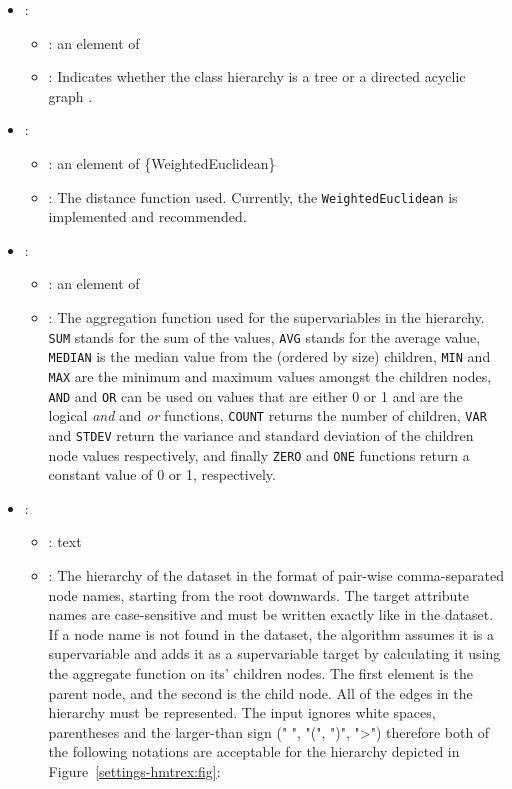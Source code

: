 \begin{itemize}
    \item {}:
           \begin{itemize}
                \item \optionPossibleValues{}: an element of 
                \item \optionDescrption{}: Indicates whether the class hierarchy is a tree or a directed acyclic graph \cite{Vens08:jrnl}.
           \end{itemize}
    \item {}:
           \begin{itemize}
                \item \optionPossibleValues{}: an element of \{WeightedEuclidean\}
                \item \optionDescrption{}: The distance function used. Currently, the {\tt WeightedEuclidean} is implemented and recommended.
           \end{itemize}
    \item {}:
           \begin{itemize}
                \item \optionPossibleValues{}: an element of 
                \item \optionDescrption{}:  The aggregation function used for the supervariables in the hierarchy.  {\tt SUM} stands for the sum of the values, {\tt AVG} stands for the average value, {\tt MEDIAN} is the median value from the (ordered by size) children, {\tt MIN} and {\tt MAX} are the minimum and maximum values amongst the children nodes, {\tt AND} and {\tt OR} can be used on values that are either 0 or 1 and are the logical \textit{and} and \textit{or} functions, {\tt COUNT} returns the number of children, {\tt VAR} and {\tt STDEV} return the variance and standard deviation of the children node values respectively, and finally {\tt ZERO} and {\tt ONE} functions return a constant value of 0 or 1, respectively.
           \end{itemize}
    \item {}:
           \begin{itemize}
                \item \optionPossibleValues{}: text
                \item \optionDescrption{}: The hierarchy of the dataset in the format of pair-wise comma-separated node names, starting from the root downwards. The target attribute names are case-sensitive and must be written exactly like in the dataset. If a node name is not found in the dataset, the algorithm assumes it is a supervariable and adds it as a supervariable target by calculating it using the aggregate function on its' children nodes. The first element is the parent node, and the second is the child node. All of the edges in the hierarchy must be represented. The input ignores white spaces, parentheses and the larger-than sign (" ", "(", ")", "\textgreater") therefore both of the following notations are acceptable for the hierarchy depicted in Figure~\ref{settings-hmtrex:fig}:

\end{itemize}
\end{itemize}
